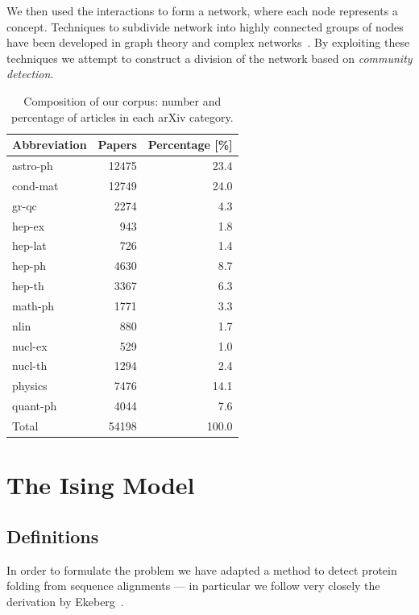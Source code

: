 \documentclass[a4paper,12pt,twoside]{article}
\begin{document}
We then used the interactions to form a network, where each node represents a concept.
Techniques to subdivide network into highly connected groups of nodes have been developed in graph theory and complex networks~\cite{newman2004}.
By exploiting these techniques we attempt to construct a division of the network based on {\em community detection}.

\begin{table}[h]
  \begin{center}
    \begin{tabular}{lrr}
    \hline
    Abbreviation & Papers & Percentage [\%] \\
    \hline
    astro-ph & 12475 & 23.4 \\
    cond-mat & 12749 & 24.0\\
    gr-qc & 2274 & 4.3\\
    hep-ex & 943 & 1.8\\
    hep-lat & 726 & 1.4\\
    hep-ph & 4630 & 8.7\\
    hep-th & 3367 & 6.3\\
    math-ph & 1771 & 3.3\\
    nlin & 880 & 1.7 \\
    nucl-ex & 529 & 1.0\\
    nucl-th & 1294 & 2.4\\
    physics & 7476 & 14.1\\
    quant-ph & 4044 & 7.6\\
    \hline
    Total & 54198 & 100.0 \\
    \hline
    \end{tabular}
  \caption{\label{tab:cats} Composition of our corpus: number and percentage of articles in each arXiv category.}
  \end{center}
\end{table} 
\section{The Ising Model}
\subsection{Definitions}
In order to formulate the problem we have adapted a method to detect protein folding from sequence alignments --- in particular we follow very closely the derivation by Ekeberg~\cite{eke2012}. 
\end{document}
